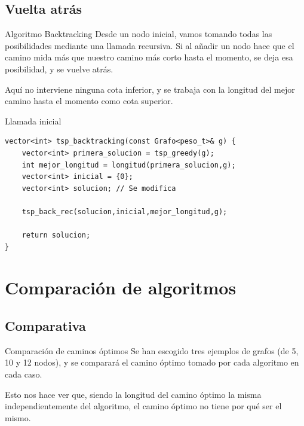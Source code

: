 \subsection{Vuelta atrás}

\begin{frame}{Algoritmo Backtracking}
  Desde un nodo inicial, vamos tomando todas las posibilidades mediante una llamada recursiva. Si al añadir un nodo hace que el camino mida más que nuestro camino más corto hasta el momento, se deja esa posibilidad, y se vuelve atrás.
  
  Aquí no interviene ninguna cota inferior, y se trabaja con la longitud del mejor camino hasta el momento como cota superior.
\end{frame}

\begin{frame}[fragile]{Llamada inicial}
\begin{lstlisting}
vector<int> tsp_backtracking(const Grafo<peso_t>& g) {
	vector<int> primera_solucion = tsp_greedy(g);
	int mejor_longitud = longitud(primera_solucion,g);
	vector<int> inicial = {0};
	vector<int> solucion; // Se modifica

	tsp_back_rec(solucion,inicial,mejor_longitud,g);

	return solucion;
}
\end{lstlisting}
\end{frame}

\section{Comparación de algoritmos}

\subsection{Comparativa}

\begin{frame}{Comparación de caminos óptimos}
	Se han escogido tres ejemplos de grafos (de 5, 10 y 12 nodos), y se comparará el camino óptimo tomado por cada algoritmo en cada caso.
	
	Esto nos hace ver que, siendo la longitud del camino óptimo la misma independientemente del algoritmo, el camino óptimo no tiene por qué ser el mismo.
\end{frame}

